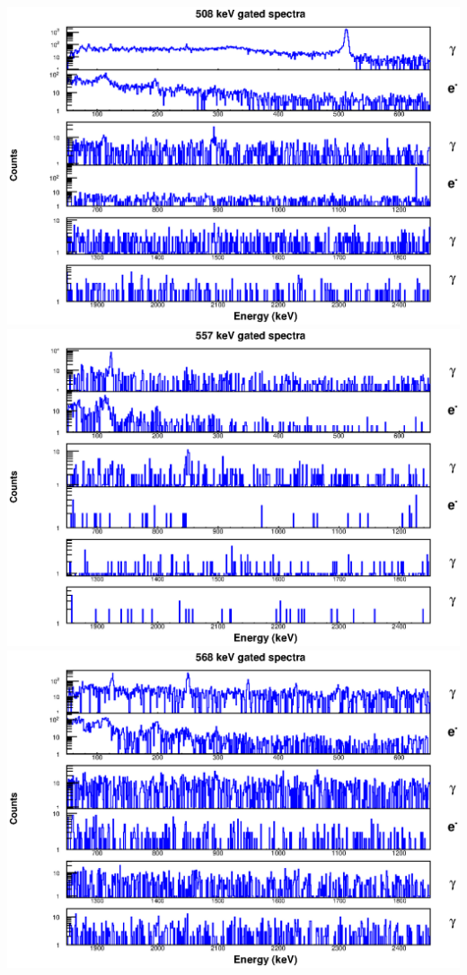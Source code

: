 \includegraphics[scale=0.8]{154Gd_Appendix/508_combined.eps}
\includegraphics[scale=0.8]{154Gd_Appendix/557_combined.eps}
\includegraphics[scale=0.8]{154Gd_Appendix/568_combined.eps}
